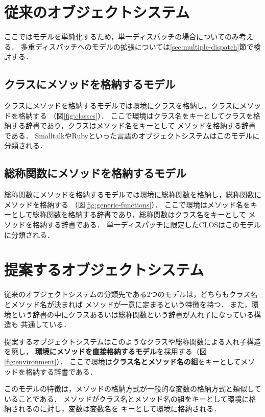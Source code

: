 \documentclass{ipsjprosym}
\begin{document}
\section{従来のオブジェクトシステム}

ここではモデルを単純化するため，単一ディスパッチの場合についてのみ考える．
多重ディスパッチへのモデルの拡張については\ref{sec:multiple-dispatch}節で検討する．

\subsection{クラスにメソッドを格納するモデル}

クラスにメソッドを格納するモデルでは環境にクラスを格納し，クラスにメソッドを格納する
（図\ref{fig:classes}）．
ここで環境はクラス名をキーとしてクラスを格納する辞書であり，クラスはメソッド名をキーとして
メソッドを格納する辞書である．
SmalltalkやRubyといった言語のオブジェクトシステムはこのモデルに分類される．

\subsection{総称関数にメソッドを格納するモデル}
\label{sec:generic-finctions}

総称関数にメソッドを格納するモデルでは環境に総称関数を格納し，総称関数にメソッドを格納する
（図\ref{fig:generic-functions}）．
ここで環境はメソッド名をキーとして総称関数を格納する辞書であり，総称関数はクラス名をキーとして
メソッドを格納する辞書である．
単一ディスパッチに限定したCLOSはこのモデルに分類される．

\section{提案するオブジェクトシステム}
\label{sec:proposal}

従来のオブジェクトシステムの分類先である2つのモデルは，どちらもクラス名とメソッド名が決まれば
メソッドが一意に定まるという特徴を持つ．
また，環境という辞書の中にクラスあるいは総称関数という辞書が入れ子になっている構造も
共通している．

提案するオブジェクトシステムはこのようなクラスや総称関数による入れ子構造を廃し，
\textbf{環境にメソッドを直接格納するモデル}を採用する（図\ref{fig:environment}）．
ここで環境は\textbf{クラス名とメソッド名の組}をキーとしてメソッドを格納する辞書である．

このモデルの特徴は，メソッドの格納方式が一般的な変数の格納方式と類似していることである．
メソッドがクラス名とメソッド名の組をキーとして環境に格納されるのに対し，変数は変数名を
キーとして環境に格納される．
\end{document}
